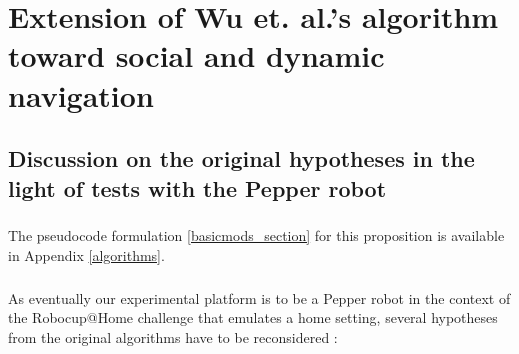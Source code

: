 
\chapter{Extension of Wu et. al.'s algorithm toward social and dynamic navigation} %

\label{Chapter4} %

\section{Discussion on the original hypotheses in the light of tests with the Pepper robot}

\paragraph{} The pseudocode formulation \ref{basicmods_section} for this proposition is available in Appendix \ref{algorithms}.

\paragraph{} As eventually our experimental platform is to be a Pepper robot in the context of the Robocup@Home challenge that emulates a home setting, several hypotheses from the original algorithms have to be reconsidered :

